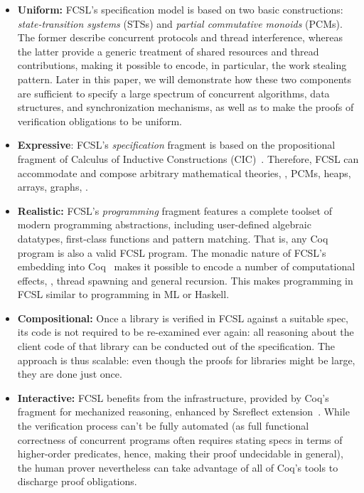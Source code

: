\begin{itemize}[leftmargin=*]

\item \textbf{Uniform:} FCSL's specification model is based on two
  basic constructions: \emph{state-transition systems} (STSs) and
  \emph{partial commutative monoids} (PCMs). The former describe
  concurrent protocols and thread interference, whereas the latter
  provide a generic treatment of shared resources and thread
  contributions, making it possible to encode, in particular, the work
  stealing pattern. Later in this paper, we will demonstrate how these
  two components are sufficient to specify a large spectrum of
  concurrent algorithms, data structures, and synchronization
  mechanisms, as well as to make the proofs of verification
  obligations to be uniform.

\item \textbf{Expressive}: FCSL's \emph{specification} fragment is
  based on the propositional fragment of Calculus of Inductive
  Constructions (CIC)~\cite{Bertot-Casteran:BOOK}. Therefore, FCSL can
  accommodate and compose arbitrary mathematical theories, \eg, PCMs,
  heaps, arrays, graphs, \etc.
%

\item \textbf{Realistic:} FCSL's \emph{programming} fragment features
  a complete toolset of modern programming abstractions, including
  user-defined algebraic datatypes, first-class functions and pattern
  matching. That is, any Coq program is also a valid FCSL program.
  The monadic nature of FCSL's embedding into
  Coq~\cite{Nanevski-al:ICFP06} makes it possible to encode a number
  of computational effects, \eg, thread spawning and general
  recursion. This makes programming in FCSL similar to programming in
  ML or Haskell.

\item \textbf{Compositional:} Once a library is verified in FCSL
  against a suitable spec, its code is not required to be re-examined
  ever again: all reasoning about the client code of that library can
  be conducted out of the specification. 
  The approach is thus scalable: even though the proofs for
  libraries might be large, they are done just once.

\item \textbf{Interactive:} FCSL benefits from the infrastructure,
  provided by Coq's fragment for mechanized reasoning, enhanced by
  Ssreflect extension~\cite{Gonthier-al:TR}.
% 
%
%
  While the verification process can't be fully automated (as full
  functional correctness of concurrent programs often requires stating
  specs in terms of higher-order predicates, hence, making their proof
  undecidable in general), the human prover nevertheless can take
  advantage of all of Coq's tools to discharge proof obligations.


\end{itemize}
